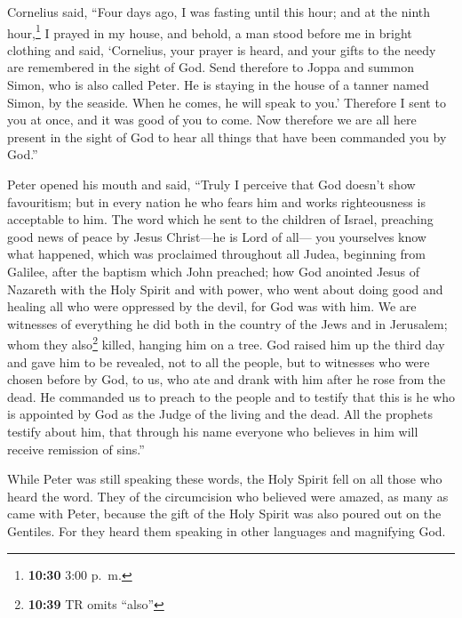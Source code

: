  Cornelius said, ``Four days ago, I was fasting until
this hour; and at the ninth hour,\footnote{\textbf{10:30} 3:00 p.~m.} I
prayed in my house, and behold, a man stood before me in bright clothing
 and said, `Cornelius, your prayer is heard, and your
gifts to the needy are remembered in the sight of God. 
Send therefore to Joppa and summon Simon, who is also called Peter. He
is staying in the house of a tanner named Simon, by the seaside. When he
comes, he will speak to you.'  Therefore I sent to you at
once, and it was good of you to come. Now therefore we are all here
present in the sight of God to hear all things that have been commanded
you by God.''

 Peter opened his mouth and said, ``Truly I perceive that
God doesn't show favouritism;  but in every nation he who
fears him and works righteousness is acceptable to him. 
The word which he sent to the children of Israel, preaching good news of
peace by Jesus Christ---he is Lord of all---  you
yourselves know what happened, which was proclaimed throughout all
Judea, beginning from Galilee, after the baptism which John preached;
 how God anointed Jesus of Nazareth with the Holy Spirit
and with power, who went about doing good and healing all who were
oppressed by the devil, for God was with him.  We are
witnesses of everything he did both in the country of the Jews and in
Jerusalem; whom they also\footnote{\textbf{10:39} TR omits ``also''}
killed, hanging him on a tree.  God raised him up the
third day and gave him to be revealed,  not to all the
people, but to witnesses who were chosen before by God, to us, who ate
and drank with him after he rose from the dead.  He
commanded us to preach to the people and to testify that this is he who
is appointed by God as the Judge of the living and the dead.
 All the prophets testify about him, that through his
name everyone who believes in him will receive remission of sins.''

 While Peter was still speaking these words, the Holy
Spirit fell on all those who heard the word.  They of the
circumcision who believed were amazed, as many as came with Peter,
because the gift of the Holy Spirit was also poured out on the Gentiles.
 For they heard them speaking in other languages and
magnifying God.

